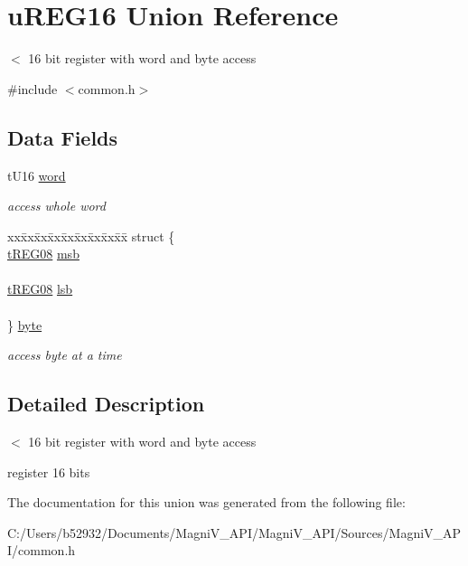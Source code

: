 \hypertarget{unionu_r_e_g16}{}\section{u\+R\+E\+G16 Union Reference}
\label{unionu_r_e_g16}


$<$ 16 bit register with word and byte access  




{\ttfamily \#include $<$common.\+h$>$}

\subsection*{Data Fields}
\begin{DoxyCompactItemize}
\item 
\hypertarget{unionu_r_e_g16_a740c6e01add2b9960472a1c87ee4e013}{}t\+U16 \hyperlink{unionu_r_e_g16_a740c6e01add2b9960472a1c87ee4e013}{word}\label{unionu_r_e_g16_a740c6e01add2b9960472a1c87ee4e013}

\begin{DoxyCompactList}\small\item\em access whole word \end{DoxyCompactList}\item 
\hypertarget{unionu_r_e_g16_ace903a87f903f8a3c0bf66c235fc93dc}{}\begin{tabbing}
xx\=xx\=xx\=xx\=xx\=xx\=xx\=xx\=xx\=\kill
struct \{\\
\>\hyperlink{unionu_r_e_g08}{tREG08} \hyperlink{unionu_r_e_g16_a8ab3670a1b1c7fc4e5e6c0df2bc60748}{msb}\\
\>\\
\>\hyperlink{unionu_r_e_g08}{tREG08} \hyperlink{unionu_r_e_g16_a228f29efa5ff0b9d9d7a0460241a86e0}{lsb}\\
\>\\
\} \hyperlink{unionu_r_e_g16_ace903a87f903f8a3c0bf66c235fc93dc}{byte}\label{unionu_r_e_g16_ace903a87f903f8a3c0bf66c235fc93dc}
\\

\end{tabbing}\begin{DoxyCompactList}\small\item\em access byte at a time \end{DoxyCompactList}\end{DoxyCompactItemize}


\subsection{Detailed Description}
$<$ 16 bit register with word and byte access 

register 16 bits 

The documentation for this union was generated from the following file\+:\begin{DoxyCompactItemize}
\item 
C\+:/\+Users/b52932/\+Documents/\+Magni\+V\+\_\+\+A\+P\+I/\+Magni\+V\+\_\+\+A\+P\+I/\+Sources/\+Magni\+V\+\_\+\+A\+P\+I/common.\+h\end{DoxyCompactItemize}
